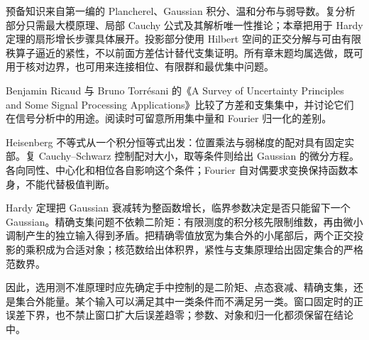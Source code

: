 \ProseParagraphBreak

预备知识来自第一编的 Plancherel、Gaussian 积分、温和分布与弱导数。复分析部分只需最大模原理、局部 Cauchy 公式及其解析唯一性推论；本章把用于 Hardy 定理的扇形增长步骤具体展开。投影部分使用 Hilbert 空间的正交分解与可由有限秩算子逼近的紧性，不以前面方差估计替代支集证明。所有章末题均属选做，既可用于核对边界，也可用来连接相位、有限群和最优集中问题。

\ProseParagraphBreak

Benjamin Ricaud 与 Bruno Torrésani 的《A Survey of Uncertainty Principles and Some Signal Processing Applications》\cite[Sections 3.2 and 3.3.2]{Ricaud2013Survey}比较了方差和支集集中，并讨论它们在信号分析中的用途。阅读时可留意所用集中量和 Fourier 归一化的差别。





\begin{chaptersummary}
Heisenberg 不等式从一个积分恒等式出发：位置乘法与弱梯度的配对具有固定实部。复 Cauchy--Schwarz 控制配对大小，取等条件则给出 Gaussian 的微分方程。各向同性、中心化和相位各自影响这个条件；Fourier 自对偶要求变换保持函数本身，不能代替极值判断。

\ProseParagraphBreak

Hardy 定理把 Gaussian 衰减转为整函数增长，临界参数决定是否只能留下一个 Gaussian。精确支集问题不依赖二阶矩：有限测度的积分核先限制维数，再由微小调制产生的独立输入得到矛盾。把精确零值放宽为集合外的小尾部后，两个正交投影的乘积成为合适对象；核范数给出体积界，紧性与支集原理给出固定集合的严格范数界。

\ProseParagraphBreak

因此，选用测不准原理时应先确定手中控制的是二阶矩、点态衰减、精确支集，还是集合外能量。某个输入可以满足其中一类条件而不满足另一类。窗口固定时的正误差下界，也不禁止窗口扩大后误差趋零；参数、对象和归一化都须保留在结论中。
\end{chaptersummary}

\BookExercises

